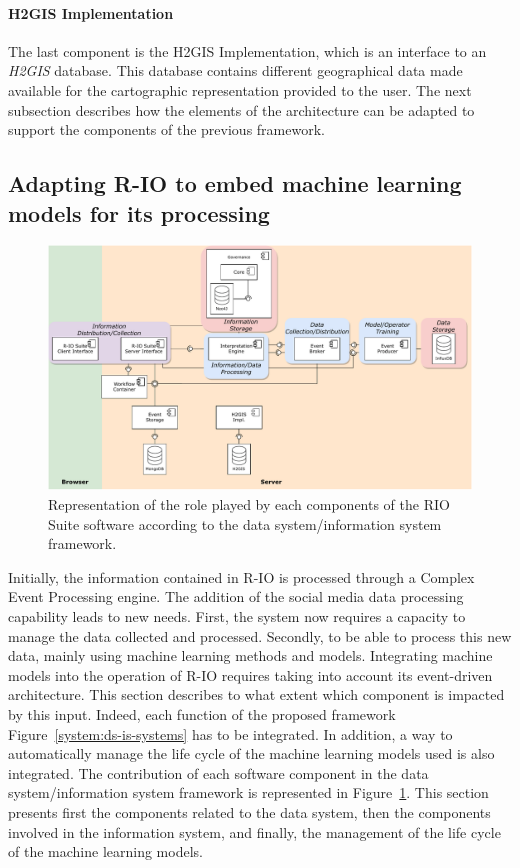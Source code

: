 \paragraph{H2GIS Implementation}
The last component is the H2GIS Implementation, which is an interface to an \textit{H2GIS} database.
This database contains different geographical data made available for the cartographic representation provided to the user.
The next subsection describes how the elements of the architecture can be adapted to support the components of the previous framework.

\subsection{Adapting R-IO to embed machine learning models for its processing}
\begin{figure}[htb]
    \centering
    \includegraphics[width=\textwidth]{figures/chap-5/RIO-archi-concepts.pdf}
    \caption{Representation of the role played by each components of the RIO Suite software according to the data system/information system framework.}
    \label{system:rio-archi-contribution}
\end{figure}

Initially, the information contained in R-IO is processed through a Complex Event Processing engine.
The addition of the social media data processing capability leads to new needs.
First, the system now requires a capacity to manage the data collected and processed.
Secondly, to be able to process this new data, mainly using machine learning methods and models.
Integrating machine models into the operation of R-IO requires taking into account its event-driven architecture.
This section describes to what extent which component is impacted by this input.
Indeed, each function of the proposed framework Figure~\ref{system:ds-is-systems} has to be integrated.
In addition, a way to automatically manage the life cycle of the machine learning models used is also integrated.
The contribution of each software component in the data system/information system framework is represented in Figure~\ref{system:rio-archi-contribution}.
This section presents first the components related to the data system, then the components involved in the information system, and finally, the management of the life cycle of the machine learning models.

